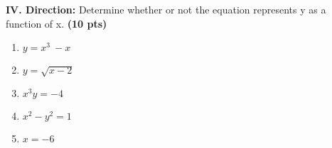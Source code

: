 \documentclass[11pt]{article}
\begin{document}
\noindent \textbf{IV. Direction:} Determine whether or not the equation represents y as a function of x. \textbf{(10 pts)}
\begin{enumerate}
\item$y=x^3\ -x$
\item$y=\sqrt{x-2}$
\item$x^3y=-4$
\item$x^2-y^2=1$
\item$x=-6$


\end{enumerate}
\end{document}
